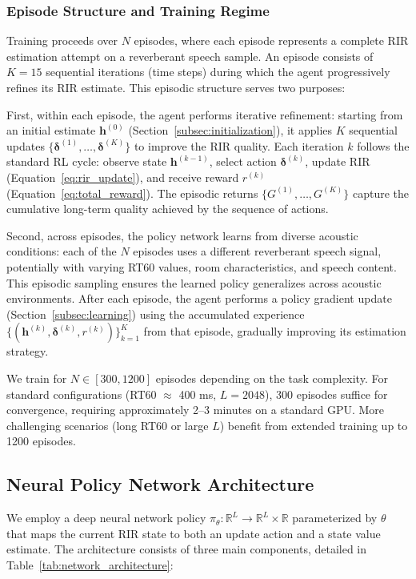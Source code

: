 \subsubsection{Episode Structure and Training Regime}

Training proceeds over $N$ episodes, where each episode represents a complete RIR estimation attempt on a reverberant speech sample. An episode consists of $K = 15$ sequential iterations (time steps) during which the agent progressively refines its RIR estimate. This episodic structure serves two purposes:

First, within each episode, the agent performs iterative refinement: starting from an initial estimate $\mathbf{h}^{(0)}$ (Section~\ref{subsec:initialization}), it applies $K$ sequential updates $\{\boldsymbol{\delta}^{(1)}, \ldots, \boldsymbol{\delta}^{(K)}\}$ to improve the RIR quality. Each iteration $k$ follows the standard RL cycle: observe state $\mathbf{h}^{(k-1)}$, select action $\boldsymbol{\delta}^{(k)}$, update RIR (Equation~\ref{eq:rir_update}), and receive reward $r^{(k)}$ (Equation~\ref{eq:total_reward}). The episodic returns $\{G^{(1)}, \ldots, G^{(K)}\}$ capture the cumulative long-term quality achieved by the sequence of actions.

Second, across episodes, the policy network learns from diverse acoustic conditions: each of the $N$ episodes uses a different reverberant speech signal, potentially with varying RT60 values, room characteristics, and speech content. This episodic sampling ensures the learned policy generalizes across acoustic environments. After each episode, the agent performs a policy gradient update (Section~\ref{subsec:learning}) using the accumulated experience $\{(\mathbf{h}^{(k)}, \boldsymbol{\delta}^{(k)}, r^{(k)})\}_{k=1}^K$ from that episode, gradually improving its estimation strategy.

We train for $N \in [300, 1200]$ episodes depending on the task complexity. For standard configurations (RT60 $\approx$ 400 ms, $L = 2048$), 300 episodes suffice for convergence, requiring approximately 2--3 minutes on a standard GPU. More challenging scenarios (long RT60 or large $L$) benefit from extended training up to 1200 episodes.

\subsection{Neural Policy Network Architecture}
\label{subsec:network}

We employ a deep neural network policy $\pi_\theta: \mathbb{R}^L \rightarrow \mathbb{R}^L \times \mathbb{R}$ parameterized by $\theta$ that maps the current RIR state to both an update action and a state value estimate. The architecture consists of three main components, detailed in Table~\ref{tab:network_architecture}:

